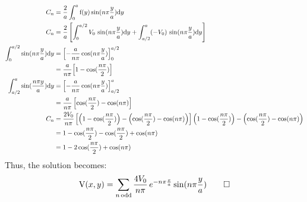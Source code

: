 \begin{hwkProblem}{3.13}{}
	\begin{align*}
		C_n &= \frac{2}{a}\int_{0}^{a} \func{f}[y]\sin{n \pi \frac{y}{a}}\mathrm{d}y \\
		C_n &= \frac{2}{a}\left[\int_{0}^{a/2} V_0\,\sin{n \pi \frac{y}{a}}\mathrm{d}y + \int_{a/2}^{a} (-V_0)\,\sin{n \pi \frac{y}{a}}\mathrm{d}y\right] \\
		\int_{0}^{a/2} \sin{n \pi \frac{y}{a}}\mathrm{d}y &= {\left[-\frac{a}{n\pi}\cos{n \pi \frac{y}{a}}\right]}_{0}^{a/2} \\
		&=\frac{a}{n\pi}{\left[1-\cos{\frac{n\pi}{2}}\right]} \\ 
		\int_{a/2}^{a} \sin{\frac{n\pi y}{a}}\mathrm{d}y &= {\left[-\frac{a}{n\pi}\cos{n \pi \frac{y}{a}}\right]}_{a/2}^{a} \\
		&=\frac{a}{n\pi}\left[\cos{\frac{n\pi}{2}}-\cos{n\pi}\right] \\
		C_n &= \frac{2V_0}{n\pi}\left[\left(1-\cos{\frac{n\pi}{2}}\right)-\left(\cos{\frac{n\pi}{2}}-\cos{n\pi}\right)\right] \left(1-\cos{\frac{n\pi}{2}}\right)-\left(\cos{\frac{n\pi}{2}}-\cos{n\pi}\right) \\
		&= 1 -\cos{\frac{n\pi}{2}}-\cos{\frac{n\pi}{2}}+\cos{n\pi} \\
		&= 1 - 2\cos{\frac{n\pi}{2}}+\cos{n\pi}
	\end{align*}
	Thus, the solution becomes:
	\[
		\func{V}[x, y]=\sum_{n\,\text{odd}} \frac{4V_0}{n\pi}\,e^{-n\pi \frac{x}{a}}\sin{n \pi \frac{y}{a}} \qed
	\]

\end{hwkProblem}
